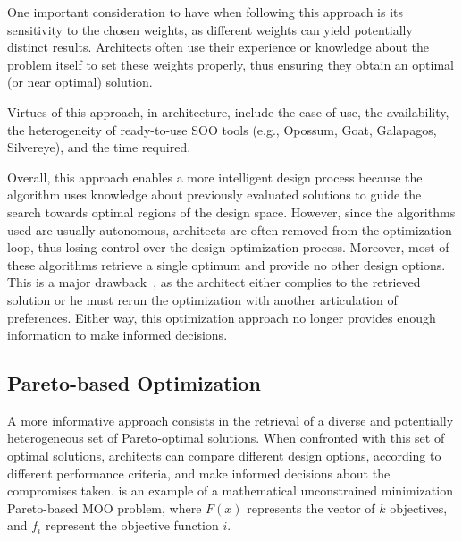 	One important consideration to have when following this approach is its sensitivity to the chosen weights, as different weights can yield potentially distinct results. Architects often use their experience or knowledge about the problem itself to set these weights properly, thus ensuring they obtain an optimal (or near optimal) solution.
	
	Virtues of this approach, in architecture, include the ease of use, the availability, the heterogeneity of ready-to-use \ac{SOO} tools (e.g., Opossum, Goat, Galapagos, Silvereye), and the time required. %
	
	Overall, this approach enables a more intelligent design process because the algorithm uses knowledge about previously evaluated solutions to guide the search towards optimal regions of the design space. However, since the algorithms used are usually autonomous, architects are often removed from the optimization loop, thus losing control over the design optimization process. Moreover, most of these algorithms retrieve a single optimum and provide no other design options. This is a major drawback~\cite{Cichocka2017SURVEY}, as the architect either complies to the retrieved solution or he must rerun the optimization with another articulation of preferences. Either way, this optimization approach no longer provides enough information to make informed decisions.
	
	\subsection{Pareto-based Optimization}
	
	A more informative approach consists in the retrieval of a diverse and potentially heterogeneous set of Pareto-optimal solutions. When confronted with this set of optimal solutions, architects can compare different design options, according to different performance criteria, and make informed decisions about the compromises taken.  is an example of a mathematical unconstrained minimization Pareto-based \ac{MOO} problem, where $F(x)$ represents the vector of $k$ objectives, and $f_i$ represent the objective function $i$.
	
